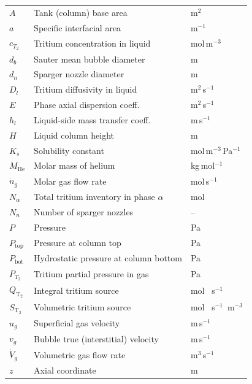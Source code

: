\begin{xltabular}{\linewidth}{@{}l X l@{}}
$A$          & Tank (column) base area                     & m$^2$ \\
$a$            & Specific interfacial area                  & m$^{-1}$ \\
$c_{T_2}$      & Tritium concentration in liquid            & mol\,m$^{-3}$ \\
$d_b$          & Sauter mean bubble diameter                       & m \\
$d_n$          & Sparger nozzle diameter                    & m \\
$D_l$          & Tritium diffusivity in liquid              & m$^2$\,s$^{-1}$ \\
$E$            & Phase axial dispersion coeff.              & m$^2$\,s$^{-1}$ \\
$h_l$          & Liquid-side mass transfer coeff.           & m\,s$^{-1}$ \\
$H$            & Liquid column height                       & m \\
$K_s$          & Solubility constant                        & mol\,m$^{-3}$\,Pa$^{-1}$ \\
$M_{\mathrm{He}}$ & Molar mass of helium                    & kg\,mol$^{-1}$ \\
$\dot n_g$     & Molar gas flow rate                        & mol\,s$^{-1}$ \\
$N_\alpha$          & Total tritium inventory in phase $\alpha$                 & mol \\
$N_n$          & Number of sparger nozzles                  & -- \\
$P$            & Pressure                                   & Pa \\
$P_{\mathrm{top}}$ & Pressure at column top                & Pa \\
$P_{\mathrm{bot}}$ & Hydrostatic pressure at column bottom & Pa \\
$P_{T_2}$      & Tritium partial pressure in gas            & Pa \\
$Q_\mathrm{T_2}$      & Integral tritium source            & mol \, s$^{-1}$\\
$S_\mathrm{T_2}$      & Volumetric tritium source     & mol \, s$^{-1}$\, m$^{-3}$\\
$u_g$          & Superficial gas velocity                   & m\,s$^{-1}$ \\
$v_g$       & Bubble true (interstitial) velocity                   & m\,s$^{-1}$ \\
$\dot V_g$     & Volumetric gas flow rate                   & m$^3$\,s$^{-1}$ \\
$z$            & Axial coordinate                           & m \\


\end{xltabular}

